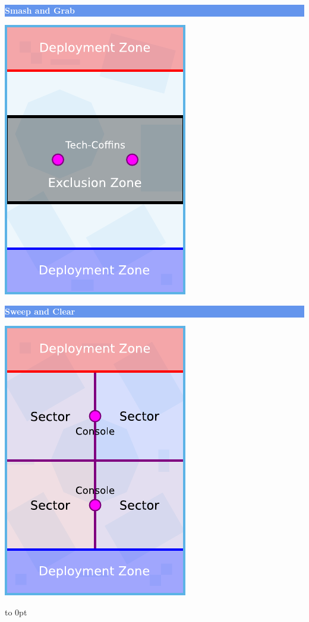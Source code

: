 \documentclass[14pt,dvipsnames]{extarticle}
\begin{document}
\vspace{-0.5em}
\noindent\hfill
\begin{minipage}{2in}\centering
\colorbox{CornflowerBlue}{\parbox[t][12pt]{\linewidth-2\fboxsep}{\centering\textcolor{White}{\textbf{Smash and Grab}}}}

\smallskip
\includegraphics[scale=0.9]{maps/map-smashandgrab}
\end{minipage}
\hfill
\begin{minipage}{2in}\centering
\colorbox{CornflowerBlue}{\parbox[t][12pt]{\linewidth}{\centering\textcolor{White}{\textbf{Sweep and Clear}}}}

\smallskip
\includegraphics[scale=0.9]{maps/map-sweepandclear}
\end{minipage}
\hfill
\hbox to 0pt{}
\end{document}
